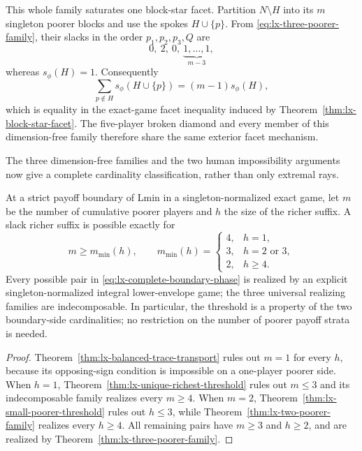 This whole family saturates one block-star facet.  Partition $N\setminus H$
into its $m$ singleton poorer blocks and use the spokes $H\cup\{p\}$.  From
\eqref{eq:lx-three-poorer-family}, their slacks in the order
$p_1,p_2,p_3,Q$ are
\[
 0,\ 2,\ 0,\ \underbrace{1,\ldots,1}_{m-3},
\]
whereas $s_\phi(H)=1$.  Consequently
\[
 \sum_{p\notin H}s_\phi(H\cup\{p\})=(m-1)s_\phi(H),
\]
which is equality in the exact-game facet inequality induced by
Theorem~\ref{thm:lx-block-star-facet}.  The five-player broken diamond and
every member of this dimension-free family therefore share the same
exterior facet mechanism.

The three dimension-free families and the two human impossibility arguments
now give a complete cardinality classification, rather than only extremal
rays.

\begin{corollary}
\label{cor:lx-boundary-shape-phase}
At a strict payoff boundary of Lmin in a singleton-normalized exact game, let
$m$ be the number of cumulative poorer players and $h$ the size of the richer
suffix.  A slack richer suffix is possible exactly for
\[
 m\geq m_{\min}(h),\qquad
 m_{\min}(h)=
 \begin{cases}
 4,&h=1,\\
 3,&h=2\text{ or }3,\\
 2,&h\geq4.
 \end{cases}                                                   \tag{PD}
 \label{eq:lx-complete-boundary-phase}
\]
Every possible pair in \eqref{eq:lx-complete-boundary-phase} is realized by
an explicit singleton-normalized integral lower-envelope game; the three
universal realizing families are indecomposable.  In
particular, the threshold is a property of the two boundary-side
cardinalities; no restriction on the number of poorer payoff strata is
needed.
\end{corollary}

\begin{proof}
Theorem~\ref{thm:lx-balanced-trace-transport} rules out $m=1$ for every $h$,
because its opposing-sign condition is impossible on a one-player poorer
side.  When $h=1$, Theorem~\ref{thm:lx-unique-richest-threshold} rules out
$m\leq3$ and its indecomposable family realizes every $m\geq4$.  When
$m=2$, Theorem~\ref{thm:lx-small-poorer-threshold} rules out $h\leq3$, while
Theorem~\ref{thm:lx-two-poorer-family} realizes every $h\geq4$.  All remaining
pairs have $m\geq3$ and $h\geq2$, and are realized by
Theorem~\ref{thm:lx-three-poorer-family}.
\end{proof}

